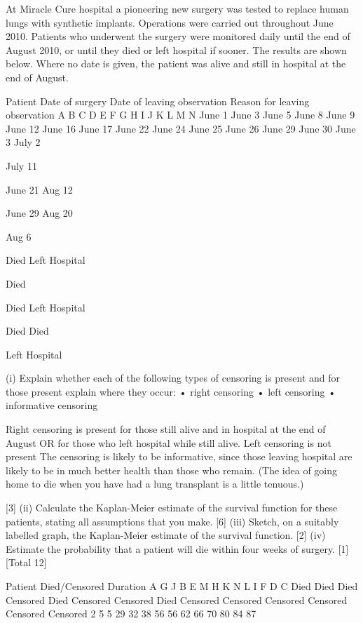 At Miracle Cure hospital a pioneering new surgery was tested to replace human lungs with synthetic implants. Operations were carried out throughout June 2010. Patients
who underwent the surgery were monitored daily until the end of August 2010, or until they died or left hospital if sooner. The results are shown below. Where no date
is given, the patient was alive and still in hospital at the end of August. 

Patient
Date of surgery
Date of leaving
observation
Reason for leaving
observation
A
B
C
D
E
F
G
H
I
J
K
L
M
N
June 1
June 3
June 5
June 8
June 9
June 12
June 16
June 17
June 22
June 24
June 25
June 26
June 29
June 30
June 3
July 2


July 11

June 21
Aug 12

June 29
Aug 20

Aug 6


Died
Left Hospital


Died

Died
Left Hospital

Died
Died

Left Hospital



(i) Explain whether each of the following types of censoring is present and for those present explain where they occur:
• right censoring
• left censoring
• informative censoring


Right censoring is present for those still alive and in hospital at the end of August OR for those who left hospital while still alive.
Left censoring is not present
The censoring is likely to be informative, since those leaving hospital are likely to be in much better health than those who remain.  
		(The idea of going home to die when you have had a lung transplant is a little tenuous.)


[3]
(ii) Calculate the Kaplan-Meier estimate of the survival function for these patients, stating all assumptions that you make. [6]
(iii) Sketch, on a suitably labelled graph, the Kaplan-Meier estimate of the survival function. [2]
(iv) Estimate the probability that a patient will die within four weeks of surgery. [1]
[Total 12]

Patient 
Died/Censored 
Duration
 A 
 G 
 J 
 B 
 E 
 M 
 H 
 K 
 N 
 L 
 I 
 F 
 D 
 C 
Died   
Died   
Died   
Censored   
Died   
Censored   
Censored   
Died   
Censored   
Censored   
Censored   
Censored   
Censored   
Censored 
 2
 5
 5
 29
 32
 38
 56
 56
 62
 66
 70
 80
 84
 87


